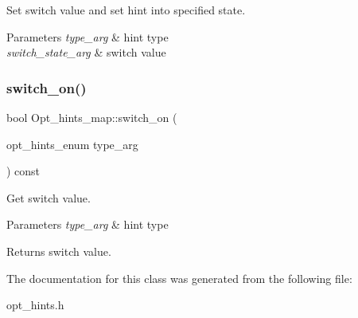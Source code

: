 Set switch value and set hint into specified state.


\begin{DoxyParams}{Parameters}
{\em type\+\_\+arg} & hint type \\
\hline
{\em switch\+\_\+state\+\_\+arg} & switch value \\
\hline
\end{DoxyParams}
\mbox{\label{classOpt__hints__map_a00cda3527fd59086e361e0bd4f6f07c4}} 
\subsubsection{\texorpdfstring{switch\+\_\+on()}{switch\_on()}}
{\footnotesize\ttfamily bool Opt\+\_\+hints\+\_\+map\+::switch\+\_\+on (\begin{DoxyParamCaption}\item[{opt\+\_\+hints\+\_\+enum}]{type\+\_\+arg }\end{DoxyParamCaption}) const\hspace{0.3cm}{\ttfamily [inline]}}

Get switch value.


\begin{DoxyParams}{Parameters}
{\em type\+\_\+arg} & hint type\\
\hline
\end{DoxyParams}
\begin{DoxyReturn}{Returns}
switch value. 
\end{DoxyReturn}


The documentation for this class was generated from the following file\+:\begin{DoxyCompactItemize}
\item 
opt\+\_\+hints.\+h\end{DoxyCompactItemize}
